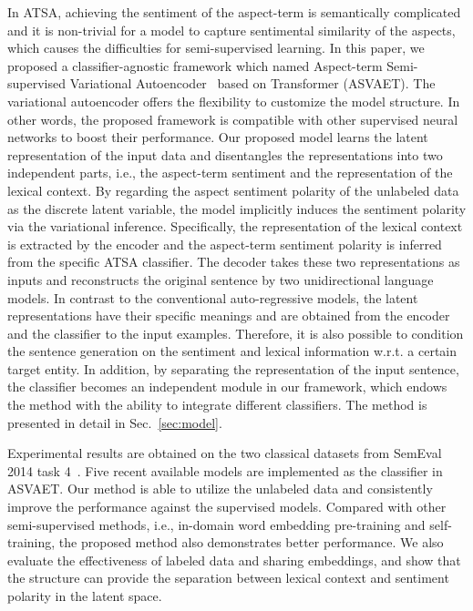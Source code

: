 \documentclass[11pt,a4paper]{article}
\begin{document}
In ATSA, achieving the sentiment of the aspect-term is semantically complicated and it is non-trivial for a model to capture sentimental similarity of the aspects, which causes the difficulties for semi-supervised learning. In this paper, we proposed a classifier-agnostic framework which named Aspect-term Semi-supervised Variational Autoencoder~\cite{kingma2013auto} based on Transformer (ASVAET). The variational autoencoder offers the flexibility to customize the model structure. In other words, the proposed framework is compatible with other supervised neural networks to boost their performance. Our proposed model learns the latent representation of the input data and disentangles the representations into two independent parts, i.e., the aspect-term sentiment and the representation of the lexical context. By regarding the aspect sentiment polarity of the unlabeled data as the discrete latent variable, the model implicitly induces the sentiment polarity via the variational inference.
Specifically, the representation of the lexical context is extracted by the encoder and the aspect-term sentiment polarity is inferred from the specific ATSA classifier.
The decoder takes these two representations as inputs and reconstructs the original sentence by two unidirectional language models. In contrast to the conventional auto-regressive models, the latent representations have their specific meanings and are obtained from the encoder and the classifier to the input examples. Therefore, it is also possible to condition the sentence generation on the sentiment and lexical information w.r.t. a certain target entity.
In addition, by separating the representation of the input sentence, the classifier becomes an independent module in our framework, which endows the method with the ability to integrate different classifiers.
The method is presented in detail in Sec.~\ref{sec:model}.

Experimental results are obtained on the two classical datasets from SemEval 2014 task 4~\cite{DBLP:conf/semeval/PontikiGPPAM14}.
Five recent available models are implemented as the classifier in ASVAET.
Our method is able to utilize the unlabeled data and consistently improve the performance against the supervised models.
Compared with other semi-supervised methods, i.e., in-domain word embedding pre-training and self-training, the proposed method also demonstrates better performance. We also evaluate the effectiveness of labeled data and sharing embeddings, and show that the structure can provide the separation between lexical context and sentiment polarity in the latent space.
\end{document}
